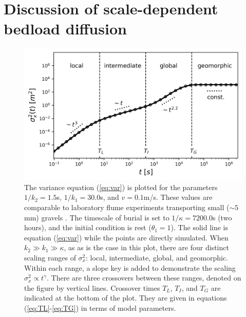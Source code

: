 \documentclass[]{agujournal2018}
\begin{document}
\section{Discussion of scale-dependent bedload diffusion}
\label{sec:discussion}
\begin{figure}[t]	
	\includegraphics[width=\linewidth,keepaspectratio]{./figures/diffusion.png}
	\caption{The variance equation (\ref{eq:var}) is plotted for the parameters $1/k_2 = 1.5$s, $1/k_1 = 30.0$s, and $v=0.1$m/s. These values are comparable to laboratory flume experiments transporting small ($\sim 5$mm) gravels \citep[cf.][]{Lajeunesse2010,Martin2012}. The timescale of burial is set to $1/\kappa = 7200.0$s (two hours), and the initial condition is rest ($\theta_1=1$). The solid line is equation (\ref{eq:var}) while the points are directly simulated. When $k_2\gg k_1 \gg \kappa$, as as is the case in this plot, there are four distinct scaling ranges of $\sigma_x^2$: local, intermediate, global, and geomorphic. Within each range, a slope key is added to demonstrate the scaling $\sigma_x^2 \propto t^\gamma$. There are three crossovers between these ranges, denoted on the figure by vertical lines. Crossover times $T_L$, $T_I$, and $T_G$ are indicated at the bottom of the plot. They are given in equations (\ref{eq:TL}-\ref{eq:TG}) in terms of model parameters. }
	\label{fig:var}
\end{figure}
\end{document}
